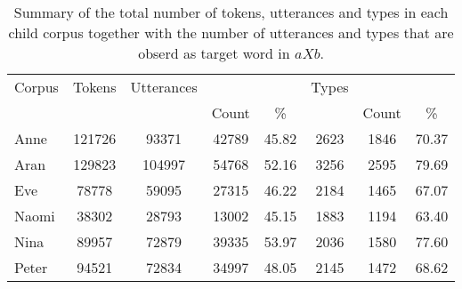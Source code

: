 \begin{table}[ht]
  \centering
  \caption{Summary of the total number of tokens, utterances and types in each
  child corpus together with the number of utterances and types that are obserd
  as target word in $aXb$.}
  \begin{tabular}{lccccccc}
    \hline
    Corpus & Tokens & Utterances &  & Types & \\
    & & & Count & \% & & Count & \% \\
    \hline
    Anne & 121726 & 93371 & 42789 & 45.82 & 2623 & 1846 & 70.37\\ 
    Aran & 129823 & 104997 & 54768 & 52.16 & 3256 & 2595 & 79.69\\ 
    Eve & 78778 & 59095 & 27315 & 46.22 & 2184 & 1465 & 67.07\\
    Naomi & 38302 & 28793 & 13002 & 45.15 & 1883 & 1194 & 63.40\\
    Nina & 89957 & 72879 & 39335 & 53.97 & 2036 & 1580 & 77.60\\
    Peter & 94521 & 72834 & 34997 & 48.05 & 2145 & 1472 & 68.62\\
    \hline
  \end{tabular}
  \label{tab:corpusstat}
\end{table}

